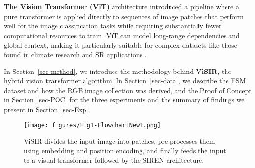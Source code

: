 \noindent \textbf{The Vision Transformer (ViT)} architecture introduced a pipeline where a pure transformer is applied directly to sequences of image patches that perform well for the image classification tasks while requiring substantially fewer computational resources to train\cite{Dosovitskiy2020}. ViT can model long-range dependencies and global context, making it particularly suitable for complex datasets like those found in climate research and SR applications \cite{Dosovitskiy2020}.



In Section~\ref{sec-method}, we introduce the methodology behind \textbf{ViSIR}, the hybrid vision transformer algorithm. In Section~\ref{sec-data}, we describe the ESM dataset and how the RGB image collection was derived, and the Proof of Concept in Section~\ref{sec-POC} for the three experiments and the summary of findings we present in Section~\ref{sec-Exp}.

\begin{figure}[!ht]
 \centering
 \texttt{[image: figures/Fig1-FlowchartNew1.png]} 
 \vspace*{-2em}
 \caption{ViSIR divides the input image into patches, pre-processes them using embedding and position encoding, and finally feeds the input to a visual transformer followed by the SIREN architecture.}
 \label{fig-Flowchart}
 \vspace*{-1em}
\end{figure}